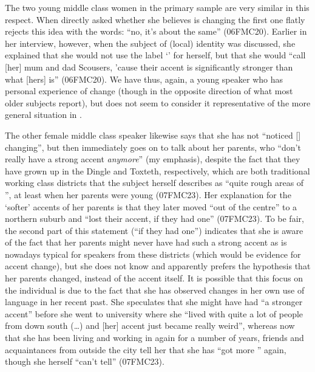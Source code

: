 The two young middle class women in the primary sample are very similar in this respect.
When directly asked whether she believes  is changing the first one flatly rejects this idea with the words: ``no, it's about the same'' (06FMC20).
Earlier in her interview, however, when the subject of (local) identity was discussed, she explained that she would not use the label `' for herself, but that she would ``call [her] mum and dad Scousers, 'cause their accent is significantly stronger than what [hers] is'' (06FMC20).
We have thus, again, a young speaker who has personal experience of  change (though in the opposite direction of what most older subjects report), but does not seem to consider it representative of the more general situation in .

The other female middle class speaker likewise says that she has not ``noticed [] changing'', but then immediately goes on to talk about her parents, who ``don't really have a strong  accent \emph{anymore}'' (my emphasis), despite the fact that they have grown up in the Dingle and Toxteth, respectively, which are both traditional working class districts that the subject herself describes as ``quite rough areas of '', at least when her parents were young (07FMC23).
Her explanation for the `softer' accents of her parents is that they later moved ``out of the centre'' to a northern suburb and ``lost their accent, if they had one'' (07FMC23).
To be fair, the second part of this statement (``if they had one'') indicates that she is aware of the fact that her parents might never have had such a strong accent as is nowadays typical for speakers from these districts (which would be evidence for accent change), but she does not know and apparently prefers the hypothesis that her parents changed, instead of the accent itself.
It is possible that this focus on the individual is due to the fact that she has observed changes in her own use of language in her recent past.
She speculates that she might have had ``a stronger accent'' before she went to university where she ``lived with quite a lot of people from down south (\ldots) and [her] accent just became really weird'', whereas now that she has been living and working in  again for a number of years, friends and acquaintances from outside the city tell her that she has ``got more '' again, though she herself ``can't tell'' (07FMC23).

